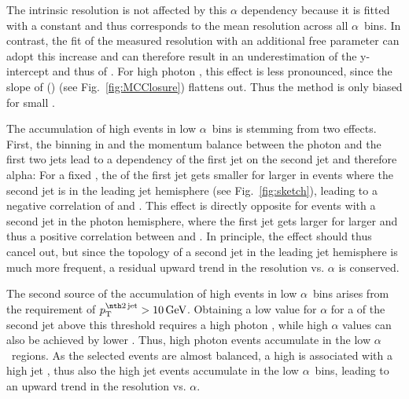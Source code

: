 The intrinsic resolution is not affected by this $\alpha$ dependency because it is fitted with a constant and thus corresponds to the mean resolution across all $\alpha$~bins.
In contrast, the fit of the measured resolution with an additional free parameter can adopt this increase and can therefore result in an underestimation of the y-intercept and thus of \jer. 
For high photon \pt, this effect is less pronounced, since the slope of \jer(\ptgamma) (see Fig.~\ref{fig:MCClosure}) flattens out. Thus the method is only biased for small \ptgamma.

The accumulation of high \ptfirstjet events in low $\alpha$~bins is stemming from two effects.
First, the binning in \ptgamma and the momentum balance between the photon and the first two jets lead to a dependency of the first jet \pt on the second jet \pt and therefore alpha: 
For a fixed \ptgamma, the \pt of the first jet gets smaller for larger \ptsecondjet in events where the second jet is in the leading jet hemisphere (see Fig.~\ref{fig:sketch}), leading to a negative correlation of \ptfirstjet and \ptsecondjet.
This effect is directly opposite for events with a second jet in the photon hemisphere, where the first jet \pt gets larger for larger \ptsecondjet and thus a positive correlation between \ptfirstjet and \ptsecondjet. 
In principle, the effect should thus cancel out, but since the topology of a second jet in the leading jet hemisphere is much more frequent, a residual upward trend in the resolution vs. $\alpha$ is conserved. 

The second source of the accumulation of high \ptfirstjet events in low $\alpha$~bins arises from the requirement of $\ptsecondjet>10\gev$.
Obtaining a low value for $\alpha$ for a \pt of the second jet above this threshold requires a high photon \pt, while high $\alpha$ values can also be achieved by lower \ptgamma.
Thus, high photon \pt events accumulate in the low $\alpha$~regions. 
As the selected events are almost balanced, a high \ptgamma is associated with a high jet \pt, thus also the high jet \pt events accumulate in the low $\alpha$~bins, leading to  an upward trend in the resolution vs. $\alpha$.\\


